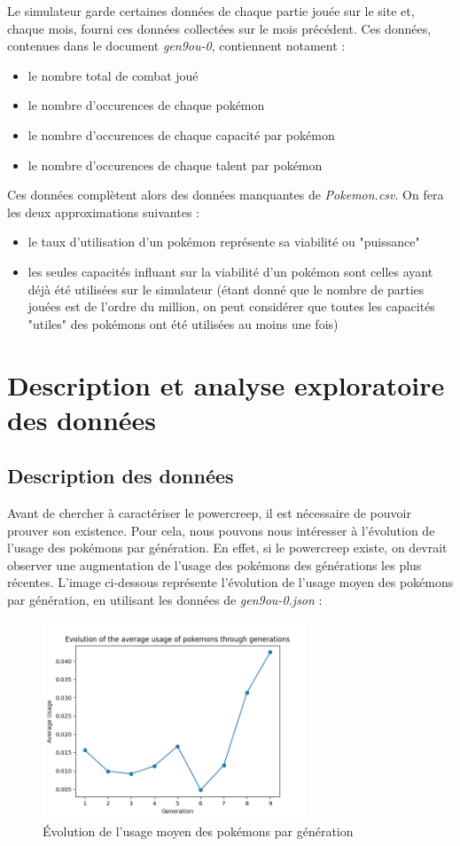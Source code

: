 \documentclass[a4paper,12pt]{article}
\begin{document}
Le simulateur garde certaines données de chaque partie jouée sur le site et,
chaque mois, fourni ces données collectées sur le mois précédent. Ces données,
contenues dans le document \textit{gen9ou-0}, contiennent notament :
\begin{itemize}
    \item le nombre total de combat joué
    \item le nombre d'occurences de chaque pokémon
    \item le nombre d'occurences de chaque capacité par pokémon
    \item le nombre d'occurences de chaque talent par pokémon
\end{itemize}
Ces données complètent alors des données manquantes de \textit{Pokemon.csv}. On
fera les deux approximations suivantes :
\begin{itemize}
    \item le taux d'utilisation d'un pokémon représente sa viabilité ou
    "puissance"
    \item les seules capacités influant sur la viabilité d'un pokémon sont
    celles ayant déjà été utilisées sur le simulateur (étant donné que le nombre
    de parties jouées est de l'ordre du million, on peut considérer que toutes
    les capacités "utiles" des pokémons ont été utilisées au moins une fois)
\end{itemize}
\section{Description et analyse exploratoire des données}
\subsection{Description des données}
Avant de chercher à caractériser le powercreep, il est nécessaire de pouvoir
prouver son existence. Pour cela, nous pouvons nous intéresser à l'évolution
de l'usage des pokémons par génération. En effet, si le powercreep existe, on
devrait observer une augmentation de l'usage des pokémons des générations les
plus récentes. L'image ci-dessous représente l'évolution de l'usage moyen des pokémons
par génération, en utilisant les données de \textit{gen9ou-0.json} :
\begin{figure}[!h]
    \centering
    \includegraphics[width=0.7\textwidth]{Image/avg_usage_by_generation.png}
    \caption{Évolution de l'usage moyen des pokémons par génération}
    \label{fig:image4}
\end{figure}
\end{document}

